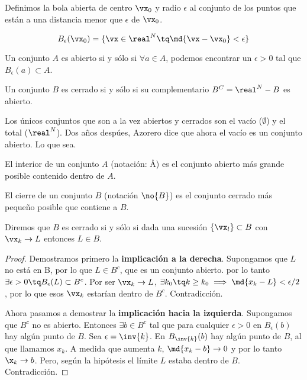 \documentclass[12pt,a4paper,titlepage]{apuntes}
\begin{document}
\begin{defn}
Definimos la bola abierta de centro $\vx_0$ y radio $\epsilon$ al conjunto de los puntos que están a una distancia menor que $\epsilon$ de $\vx_0$.

\[B_\epsilon (\vx_0) = \{ \vx \in \real^N \tq \md{\vx-\vx_0} < \epsilon\}\]
\end{defn}

\begin{defn}
Un conjunto $A$ es abierto si y sólo si $\forall a\in A$, podemos encontrar un $\epsilon >0$ tal que $B_\epsilon(a)\subset A$.\end{defn}

\begin{defn}
Un conjunto $B$ es cerrado si y sólo si su complementario $B^C=\real^N-B$ es abierto.
\end{defn}

\begin{remark} Los únicos conjuntos que son a la vez abiertos y cerrados son el vacío ($\emptyset$) y el total ($\real^N$). Dos años despúes, Azorero dice que ahora el vacío es un conjunto abierto. Lo que sea.\end{remark}

\begin{defn}[Interior] El interior de un conjunto $A$ (notación: \r{A}) es el conjunto abierto más grande posible contenido dentro de $A$.\end{defn}

\begin{defn}[Cierre] El cierre de un conjunto $B$ (notación $\no{B}$) es el conjunto cerrado más pequeño posible que contiene a $B$.\end{defn} 

\begin{theorem}
Diremos que $B$ es cerrado si y sólo si dada una sucesión $\{\vx_l\}\subset B$ con $\vx_k\to L$ entonces $L\in B$.
\end{theorem}

\begin{proof}
Demostramos primero la \textbf{implicación a la derecha}. Supongamos que $L$ no está en B, por lo que $L\in B^c$, que es un conjunto abierto. por lo tanto $\exists \epsilon >0 \tq B_\epsilon(L)\subset B^c$. Por ser $\vx_k \to L$, $\exists k_0 \tq k\geq k_0 \implies \md{x_k-L}<\epsilon / 2$, por lo que esos $\vx_k$ estarían dentro de $B^c$. Contradicción.

Ahora pasamos a demostrar la \textbf{implicación hacia la izquierda}. Supongamos que $B^c$ no es abierto. Entonces $\exists b \in B^c$ tal que para cualquier $\epsilon>0$ en $B_\epsilon(b)$ hay algún punto de $B$. Sea $\epsilon = \inv{k}$. En $B_\inv{k}(b)$ hay algún punto de $B$, al que llamamos $x_k$. A medida que aumenta $k$, $\md{x_k-b} \to 0$ y por lo tanto $\x_k \to b$. Pero, según la hipótesis el límite $L$  estaba dentro de $B$. Contradicción.
\end{proof}
\end{document}
